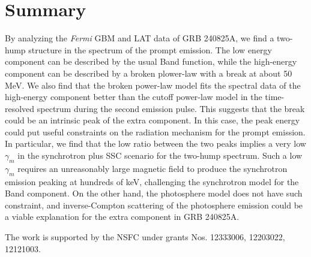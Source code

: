 \documentclass[twocolumn]{aastex631}
\begin{document}
\section{Summary} 
\label{sec:summary}
By analyzing the {\em Fermi} GBM and LAT data of GRB 240825A, we find a two-hump structure in the spectrum of the prompt emission. The low energy component can be described by the usual Band function, while the high-energy component can be described by a  broken plower-law with a  break at about 50 MeV.  We also find that the broken power-law model fits the spectral data of the high-energy component better than the cutoff power-law model in the time-resolved spectrum during the second emission pulse. This  suggests that the  break could be an intrinsic peak of the extra component. In this case, the peak energy could put useful constraints on the radiation mechanism for the prompt emission. In particular, we find that the low ratio between the two peaks implies a very low $\gamma_m$ in the synchrotron plus SSC scenario for the two-hump  spectrum. Such a low $\gamma_m$ requires an unreasonably large  magnetic field to produce the synchrotron emission peaking at hundreds of keV, challenging the synchrotron model for the Band component. On the other hand, the photosphere model does not have such constraint, and inverse-Compton scattering of the photosphere emission could be a viable explanation for the extra component in GRB 240825A. 

\begin{acknowledgments}

The work is supported by the NSFC under grants Nos. 12333006, 12203022, 12121003.
\end{acknowledgments}

%


\end{document}
